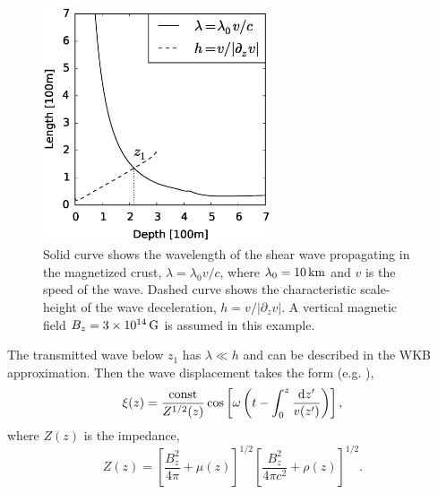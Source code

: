 \begin{figure}[h]
\centering
\includegraphics[width=0.6\textwidth]{pics/chap3/fig2.eps} 
\caption[Comparison between wavelength and characteristic scale in the crust]{Solid curve shows the wavelength of the shear wave propagating in the 
magnetized crust, $\lambda = \lambda_0 v/c$, where $\lambda_0=10\,\rm km$ and 
$v$ is the speed of the wave. Dashed curve shows the characteristic scale-height of 
the wave deceleration, $h= v/|\partial_z v|$. A vertical magnetic field 
$B_z = 3\times 10^{14}\,\rm G$ is assumed in this example.}
\label{fig2}
\end{figure}

The transmitted wave below $z_1$ has $\lambda\ll h$ and can be described in the WKB approximation. 
Then the wave displacement takes the form (e.g. \citet{f13}),
\begin{equation}
\label{eq:xi}
  \xi(z) = \frac{\rm const}{Z^{1/2}(z)}\cos\left[\omega\left( t-\int_0 ^z \frac{\mathrm{d} z'}{v(z')}\right)\right],
\end{equation}
where $Z(z)$ is the impedance,
\begin{equation}
\label{eq:Z}
  Z(z)=\left[\frac{B_z ^2}{4\pi}+\mu(z)\right]^{1/2}
          \left[\frac{B_z^2}{4\pi c^2}+\rho(z)\right]^{1/2}.
\end{equation}

